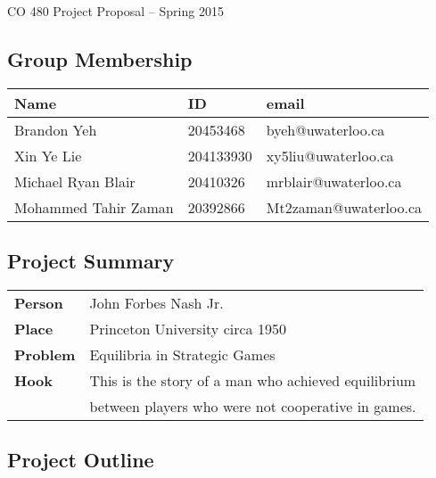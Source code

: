 \documentclass[11pt]{article}
\begin{document}
\begin{center}
{\Large CO 480 Project Proposal -- Spring 2015} 
\end{center}

\subsection*{Group Membership}
\begin{tabular}{|l|l|l|} \hline
Name & ID & email \\ \hline
Brandon Yeh & 20453468 & byeh@uwaterloo.ca\\ \hline
Xin Ye Lie & 204133930 & xy5liu@uwaterloo.ca\\ \hline
Michael Ryan Blair & 20410326 & mrblair@uwaterloo.ca \\ \hline
Mohammed Tahir Zaman & 20392866 & Mt2zaman@uwaterloo.ca\\ \hline
\end{tabular}

\subsection*{Project Summary}
\begin{tabular}{ll}
{\bf Person}  & John Forbes Nash Jr. \\
{\bf Place}   & Princeton University circa 1950 \\
{\bf Problem} & Equilibria in Strategic Games \\
{\bf Hook }   & This is the story of a man who achieved equilibrium\\  & between players who were not cooperative in games.
\end{tabular}

\subsection*{Project Outline}
\end{document}
